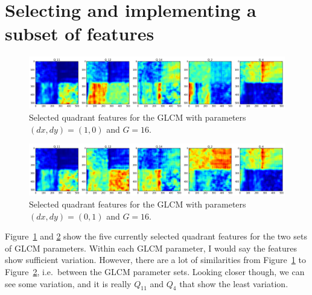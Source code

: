 \documentclass[a4paper]{article}
\begin{document}
\section{Selecting and implementing a subset of features}

\begin{figure}
    \centering
    \includegraphics[width=\textwidth]{g1feats.png}
    \caption{%
        Selected quadrant features for the GLCM with parameters $(dx,
        dy) = (1, 0)$ and $G=16$.
    }
    \label{fig:g1feats}
\end{figure}

\begin{figure}
    \centering
    \includegraphics[width=\textwidth]{g2feats.png}
    \caption{%
        Selected quadrant features for the GLCM with parameters $(dx,
        dy) = (0, 1)$ and $G=16$.
    }
    \label{fig:g2feats}
\end{figure}

Figure~\ref{fig:g1feats} and \ref{fig:g2feats} show the five currently
selected quadrant features for the two sets of GLCM parameters. Within
each GLCM parameter, I would say the features show sufficient variation.
However, there are a lot of similarities from Figure~\ref{fig:g1feats}
to Figure~\ref{fig:g2feats}, i.e.\ between the GLCM parameter sets.
Looking closer though, we can see some variation, and it is really
$Q_{11}$ and $Q_4$ that show the least variation.
\end{document}
